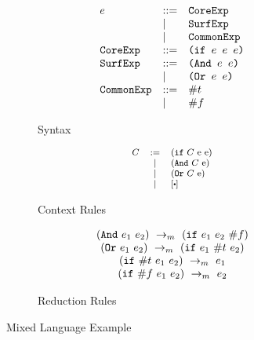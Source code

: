 \begin{figure}[t]
\centering
\begin{subfigure}{\linewidth}{\footnotesize
    \begin{flushleft}
        \[
        \begin{array}{lll}
        e &::=& \mbox{\tt CoreExp} \\
        &|&\mbox{\tt SurfExp}\\
        &|&\mbox{\tt CommonExp}\\
        \mbox{\tt CoreExp} &::=& \texttt{(if~$e$~$e$~$e$)}\\
        \mbox{\tt SurfExp} &::=& \texttt{(And~$e$~$e$)}\\
        &|&\texttt{(Or~$e$~$e$)}\\
        \mbox{\tt CommonExp} &::=& \#t\\
        &|& \#f\\
        \end{array}
        \]
    \end{flushleft}
    \caption{Syntax}
    \label{fig:mixsyntax}
}
\end{subfigure}
\begin{subfigure}{\linewidth}{\footnotesize
    \begin{flushleft}
        \[\footnotesize
        \begin{array}{lcl}
        C &:=& (\m{if}~C~$e$~$e$)\\
        &|& (\m{And}~C~$e$)\\
        &|& (\m{Or}~C~$e$)\\
        &|&[\bigcdot]\\
        \end{array}
        \]
        \end{flushleft}
    \caption{Context Rules}
    \label{fig:mixcontext}
}
\end{subfigure}

\begin{subfigure}{\linewidth}{\footnotesize
    \begin{flushleft}
        \[
        \begin{array}{c}
        (\mbox{\tt And}~e_1~e_2) ~\rightarrow_m~(\mbox{\tt if}~e_1~e_2~\#f)\\
        (\mbox{\tt Or}~e_1~e_2) ~\rightarrow_m~(\mbox{\tt if}~e_1~\#t~e_2)\\
        (\mbox{\tt if}~\#t~e_1~e_2) ~\rightarrow_m~e_1\\
        (\mbox{\tt if}~\#f~e_1~e_2) ~\rightarrow_m~e_2
        \end{array}
        \]
    \end{flushleft}
    \caption{Reduction Rules}
    \label{fig:mixreduction}
}
\end{subfigure}

\caption{Mixed Language Example}
\label{fig:mixexample}
\end{figure}


